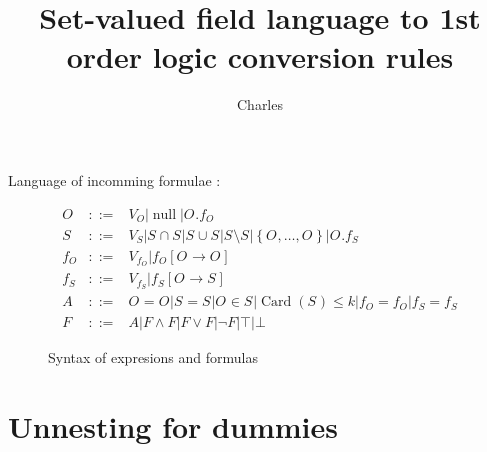 \documentclass{article}
\title{Set-valued field language to 1st order logic conversion rules}
\author{Charles}
\DeclareMathOperator{\cardop}{Card}
\newcommand{\card}[1]{\cardop \left( #1 \right)}
\newcommand{\set}[1]{\left\{ #1 \right\} }
\newcommand{\fieldwrite}[3]{#1 \left[ #2 \longrightarrow #3 \right]}
\newcommand{\ofv}[1]{V_{f_{O}}^{#1}}
\newcommand{\of}[1]{f_{O}^{#1}}
\newcommand{\obj}[1]{O_{#1}}
\newcommand{\ov}[1]{V_{O}^{#1}}
\newcommand{\sv}[1]{V_{S}^{#1}}
\newcommand{\sfv}[1]{V_{f_{S}}^{#1}}
\newcommand{\setf}[1]{f_{S}^{#1}}
\newcommand{\sett}[1]{S_{#1}}
\DeclareMathOperator{\Null}{null}
\begin{document}
\maketitle

Language of incomming formulae :

\begin{figure}[htbp] %
   \centering
   \begin{eqnarray*}
   	\obj{} & ::= & \ov{} | \Null | \obj{}.\of{} \\
	\sett{} & ::= & \sv{} | \sett{} \cap \sett{} | \sett{} \cup \sett{} | \sett{} \setminus \sett{} | \set{\obj{}, \dots, \obj{}} | \obj{}.\setf{} \\
	\of{} & ::= & \ofv{} | \fieldwrite{\of{}}{\obj{}}{\obj{}} \\
	\setf{} & ::= & \sfv{} | \fieldwrite{\setf{}}{\obj{}}{\sett{}} \\
	A & ::= & \obj{} = \obj{} | \sett{} = \sett{} | \obj{} \in \sett{} | \card{\sett{}} \leq k | \of{} = \of{} | \setf{} = \setf{} \\
	F &::=& A | F \wedge F | F \vee F | \neg F | \top | \bot
    \end{eqnarray*}
    \caption{Syntax of expresions and formulas}
   \label{fig:transitions}
\end{figure}

\section{Unnesting for dummies}
\end{document}

